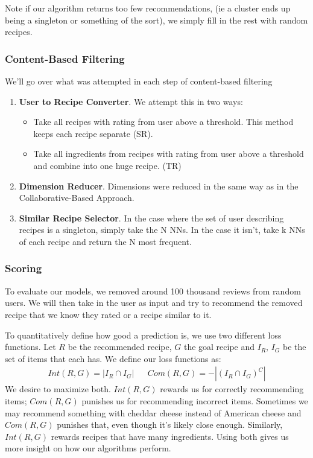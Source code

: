 \documentclass[11pt]{article}
\begin{document}
Note if our algorithm returns too few recommendations, (ie a cluster ends up being a singleton or something of the sort), we simply fill in the rest with random recipes. 

\subsubsection{Content-Based Filtering}
We'll go over what was attempted in each step of content-based filtering
\begin{enumerate}
    \item \textbf{User to Recipe Converter}. We attempt this in two ways:
    \begin{itemize}
        \item Take all recipes with rating from user above a threshold. This method keeps each recipe separate (SR).
        \item Take all ingredients from recipes with rating from user above a threshold and combine into one huge recipe. (TR) 
    \end{itemize}
    \item \textbf{Dimension Reducer}. Dimensions were reduced in the same way as in the Collaborative-Based Approach.
    \item \textbf{Similar Recipe Selector}. In the case where the set of user describing recipes is a singleton, simply take the N NNs. In the case it isn't, take k NNs of each recipe and return the N most frequent.
\end{enumerate}

\subsubsection{Scoring}

To evaluate our models, we removed around 100 thousand reviews from random users. We will then take in the user as input and try to recommend the removed recipe that we know they rated or a recipe similar to it.

To quantitatively define how good a prediction is, we use two different loss functions.  Let $R$ be the recommended recipe, $G$ the goal recipe and $I_R$, $I_G$ be the set of items that each has. We define our loss functions as:
\begin{align}
    Int(R,G) = |I_R \cap I_G| && Com(R,G) = -|(I_R \cap I_G)^C|
\end{align}
We desire to maximize both. $Int(R,G)$ rewards us for correctly recommending items; $Com(R,G)$ punishes us for recommending incorrect items. Sometimes we may recommend something with cheddar cheese instead of American cheese and $Com(R,G)$ punishes that, even though it's likely close enough. Similarly, $Int(R,G)$ rewards recipes that have many ingredients. Using both gives us more insight on how our algorithms perform.
\end{document}
